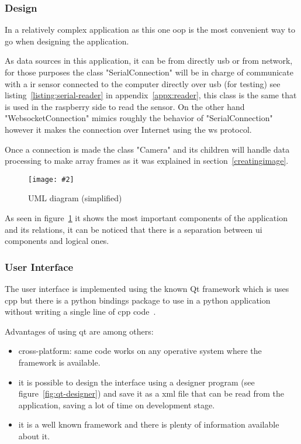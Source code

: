 \documentclass[hidelinks,11pt,a4paper,oneside,article]{memoir}
\newcommand{\putimage}[3][10] %
{
\begin{figure}[h]
	\centering
	\captionsetup{justification=centering}
	\texttt{[image: \#2]}
	\caption{#3}
	\label{fig:#2}
\end{figure}
}
\begin{document}
\subsubsection{Design}
In a relatively complex application as this one  \gls{oop} is the most convenient way to go when designing the application.

As data sources in this application, it can be from directly \gls{usb} or from network, for those purposes the class "SerialConnection" will be in charge of communicate with a \gls{ir} sensor connected to the computer directly over \gls{usb} (for testing) see listing~\ref{listing:serial-reader} in appendix~\ref{appx:reader}, this class is the same that is used in the raspberry side to read the sensor. On the other hand "WebsocketConnection" mimics roughly the behavior of "SerialConnection" however it makes the connection over Internet using the \gls{ws} protocol.

Once a connection is made the class "Camera" and its children will handle data processing to make array frames as it was explained in section~\ref{creatingimage}.

    \putimage[15]{python-uml}{UML diagram (simplified)}
    
As seen in figure~\ref{fig:python-uml} it shows the most important components of the application and its relations, it can be noticed that there is a separation between \gls{ui} components and logical ones.

\subsubsection{User Interface}
The user interface is implemented using the known Qt framework which is uses \gls{cpp} but there is a python bindings package to use in a python application without writing a single line of \gls{cpp} code~\cite{riverbank}.

Advantages of using qt are among others:
\begin{itemize}
    \item cross-platform: same code works on any operative system where the framework is available.
    \item it is possible to design the interface using a designer program (see figure~\ref{fig:qt-designer}) and save it as a \gls{xml} file that can be read from the application, saving a lot of time on development stage.
    \item it is a well known framework and there is plenty of information available about it.
\end{itemize}
\end{document}
